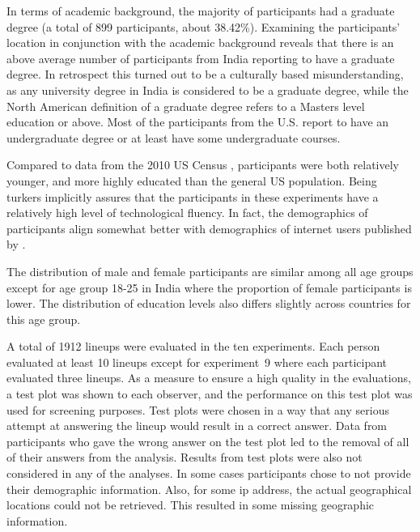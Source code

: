 \documentclass[10pt]{article}\usepackage[]{graphicx}\usepackage[]{xcolor}
\begin{document}
In terms of academic background, the majority of participants had a graduate degree (a total of 899 participants, about 38.42\%). Examining the participants' location in conjunction with the academic background reveals that there is an above average  number of participants from India reporting to have a graduate degree. In retrospect this turned out to be a culturally based misunderstanding, as any university degree in India is considered to be a graduate degree, while the North American definition of a graduate degree refers to a Masters level education or above. Most of the  participants from the U.S. report to have an undergraduate degree or at least have some undergraduate courses. 

Compared to data from the 2010 US Census \cite{census}, participants were both relatively younger, and more highly educated than the general US population. 
Being turkers implicitly assures that the participants in these experiments have a relatively high level of technological fluency. In fact, the demographics of participants align somewhat better with demographics of internet users published by
\citet{pew}.

The distribution of male and female participants are similar among all age groups except for age group 18-25 in India where the proportion of female participants is lower. The distribution of education levels also differs slightly across countries for this age group. 


A total of 1912 lineups were evaluated in the ten experiments. Each person evaluated at least 10 lineups except for experiment~9 where each participant evaluated three lineups.
As a measure to ensure a high quality in the evaluations,
 a test plot was shown to each observer, and the performance on this test plot was used for screening purposes. %
Test plots were chosen in a way that any serious attempt at answering the lineup would result in a correct answer.
Data from participants who gave the wrong answer on the test plot %
led to the removal of all of their answers from the analysis. 
Results from test plots were also not considered in any of the analyses.
 In some cases  participants chose to not provide their demographic information. Also, for some ip address, the actual geographical locations could not be retrieved. This resulted in some missing geographic information.
\end{document}
